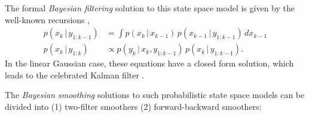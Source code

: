 \documentclass[twocolumn]{autart}    %
\begin{document}
The formal {\em Bayesian filtering} solution to this state space model is given by the well-known recursions \cite{Ho+Lee:1964},
%
\begin{equation}
\begin{split}
   p(x_k \,|\, y_{1:k-1})
   &= \int p(x_k \,|\, x_{k-1}) \, p(x_{k-1} \,|\, y_{1:k-1}) \, dx_{k-1} \\
   p(x_k \,|\, y_{1:k})
   &\propto
   p(y_k \,|\, x_k,y_{1:k-1}) \, p(x_k \,|\, y_{1:k-1}).
\end{split}
\label{eq:bfilter}
\end{equation}
%
In the linear Gaussian case, these equations have a closed form solution, which leads to the celebrated Kalman filter \cite{Kalman:1960}.

The {\em Bayesian smoothing} solutions to such probabilistic state space models can be divided into (1) two-filter smoothers (2) forward-backward smoothers:
%
\end{document}
